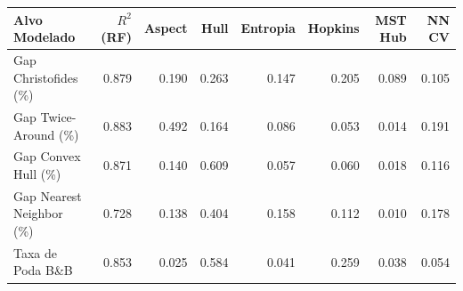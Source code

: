 \begin{tabular}{lrrrrrrr}
\hline
\textbf{Alvo Modelado} & $R^2$ (RF) & \textbf{Aspect} & \textbf{Hull} & \textbf{Entropia} & \textbf{Hopkins} & \textbf{MST Hub} & \textbf{NN CV} \\
\hline
Gap Christofides (\%) & 0.879 & 0.190 & 0.263 & 0.147 & 0.205 & 0.089 & 0.105 \\
Gap Twice-Around (\%) & 0.883 & 0.492 & 0.164 & 0.086 & 0.053 & 0.014 & 0.191 \\
Gap Convex Hull (\%) & 0.871 & 0.140 & 0.609 & 0.057 & 0.060 & 0.018 & 0.116 \\
Gap Nearest Neighbor (\%) & 0.728 & 0.138 & 0.404 & 0.158 & 0.112 & 0.010 & 0.178 \\
Taxa de Poda B\&B & 0.853 & 0.025 & 0.584 & 0.041 & 0.259 & 0.038 & 0.054 \\
\hline
\end{tabular}
